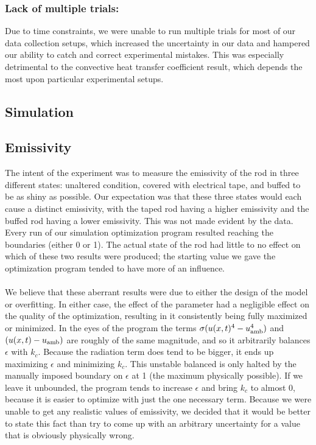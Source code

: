 \documentclass[letterpaper,titlepage,oneside]{report}
\begin{document}
\subsubsection* {Lack of multiple trials:}
Due to time constraints, we were unable to run multiple trials
for most of our data collection setups, which increased the
uncertainty in our data and hampered our ability to catch and
correct experimental mistakes. This was especially detrimental
to the convective heat transfer coefficient result,
which depends the most upon particular experimental setups. 

\subsection*{Simulation}

\subsection*{Emissivity}
The intent of the experiment was to measure the emissivity of the
rod in three different states: unaltered condition,
covered with electrical tape, and buffed to be as shiny as possible.
Our expectation was that these three states would each cause
a distinct emissivity, with the taped rod having a higher
emissivity and the buffed rod having a lower emissivity.
This was not made evident by the data. Every run of our
simulation optimization program resulted reaching the boundaries
(either 0 or 1). The actual state of the rod had little to no
effect on which of these two results were produced;
the starting value we gave the optimization program tended to have
more of an influence.
\\\\
We believe that these aberrant results were due to either the design
of the model or overfitting. In either case, the effect of the
parameter had a negligible effect on the quality of the optimization,
resulting in it consistently being fully maximized or minimized.
In the eyes of the program the terms $\sigma(u(x,t)^4-u_{\rm{amb}}^4)$
and $(u(x,t)-u_{\rm{amb}})$ are roughly of the same magnitude,
and so it arbitrarily balances $\epsilon$ with $k_c$. Because the
radiation term does tend to be bigger, it ends up 
maximizing $\epsilon$ and minimizing $k_c$. This unstable balanced is only
halted by the manually imposed boundary on $\epsilon$ at 1
(the maximum physically possible). If we leave it unbounded,
the program tends to increase $\epsilon$ and bring $k_c$ to almost 0,
because it is easier to optimize with just the one necessary term.
Because we were unable to get any realistic values of emissivity,
we decided that it would be better to state this fact than try to
come up with an arbitrary uncertainty for a value that is
obviously physically wrong.
\end{document}

